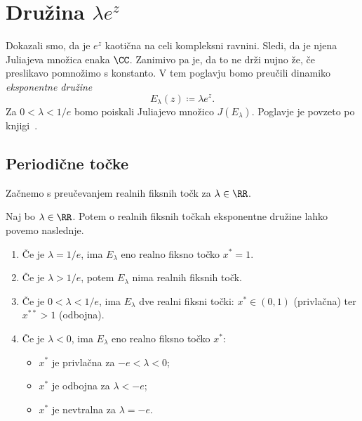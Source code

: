\section{Družina \texorpdfstring{\(\lambda e^z\)}{\lambda exp(z)}} \label{sec:druzina}

Dokazali smo, da je \(e^z\) kaotična na celi kompleksni ravnini. Sledi, da je njena Juliajeva množica enaka \(\CC\). Zanimivo pa je, da to ne drži nujno že, če preslikavo pomnožimo s konstanto. V tem poglavju bomo preučili dinamiko \emph{eksponentne družine}
\[E_\lambda (z) \coloneq \lambda e^z.\]
Za \(0 < \lambda < 1/e\) bomo poiskali Juliajevo množico \(J (E_\lambda)\). Poglavje je povzeto po knjigi~\cite[poglavje 9]{Pineiro_2025}.

\subsection{Periodične točke}

Začnemo s preučevanjem realnih fiksnih točk za \(\lambda \in \RR\).

\begin{trditev}
    Naj bo \(\lambda \in \RR\). Potem o realnih fiksnih točkah eksponentne družine lahko povemo naslednje.
    \begin{enumerate}[label=(\arabic*)]
        \item Če je \(\lambda = 1/e\), ima \(E_\lambda\) eno realno fiksno točko \(x^* = 1\).
        \item Če je \(\lambda > 1/e\), potem \(E_\lambda\) nima realnih fiksnih točk.
        \item Če je \(0 < \lambda < 1/e\), ima \(E_\lambda\) dve realni fiksni točki: \(x^* \in (0, 1)\) (privlačna) ter \(x^{**} > 1\) (odbojna).
        \item Če je \(\lambda < 0\), ima \(E_\lambda\) eno realno fiksno točko \(x^*\):
              \begin{itemize}
                  \item \(x^*\) je privlačna za \(-e < \lambda < 0\);
                  \item \(x^*\) je odbojna za \(\lambda < -e\);
                  \item \(x^*\) je nevtralna za \(\lambda = -e\).
              \end{itemize}
    \end{enumerate}
\end{trditev}

